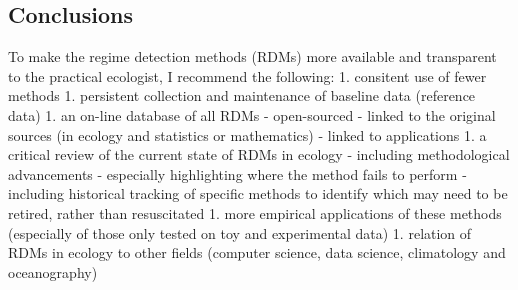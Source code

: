 \documentclass[12pt,twoside,openany]{reedthesis}
\begin{document}
\subsection{Conclusions}\label{conclusions}

To make the regime detection methods (RDMs) more available and
transparent to the practical ecologist, I recommend the following: 1.
consitent use of fewer methods 1. persistent collection and maintenance
of baseline data (reference data) 1. an on-line database of all RDMs -
open-sourced - linked to the original sources (in ecology and statistics
or mathematics) - linked to applications 1. a critical review of the
current state of RDMs in ecology - including methodological advancements
- especially highlighting where the method fails to perform - including
historical tracking of specific methods to identify which may need to be
retired, rather than resuscitated 1. more empirical applications of
these methods (especially of those only tested on toy and experimental
data) 1. relation of RDMs in ecology to other fields (computer science,
data science, climatology and oceanography)
\end{document}
